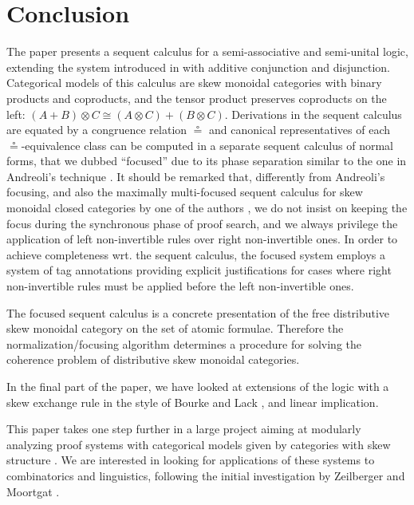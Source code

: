 \documentclass[submission,copyright,creativecommons]{eptcs}
\theoremstyle{definition}
\newcommand{\ot}{\otimes}
\begin{document}
\section{Conclusion}
The paper presents a sequent calculus for a semi-associative and semi-unital logic,  extending the system introduced in \cite{uustalu:sequent:2021} with additive conjunction and disjunction. Categorical models of this calculus are skew monoidal categories with binary products and coproducts, and the tensor product preserves coproducts on the left: $(A + B) \ot C \cong (A \ot C) + (B \ot C)$.
Derivations in the sequent calculus are equated by a congruence relation $\circeq$ and canonical representatives of each $\circeq$-equivalence class can be computed in a separate sequent calculus of normal forms, that we dubbed ``focused'' due to its phase separation similar to the one in Andreoli's technique \cite{andreoli:logic:1992}.  It should be remarked that, differently from Andreoli's focusing, and also the maximally multi-focused sequent calculus for skew monoidal closed categories by one of the authors \cite{veltri:multifocus:23}, we do not insist on keeping the focus during the synchronous phase of proof search, and we always privilege the application of left non-invertible rules over right non-invertible ones. In order to achieve completeness wrt. the sequent calculus, the focused system employs a system of tag annotations providing explicit justifications for cases where right non-invertible rules must be applied before the left non-invertible ones.

The focused sequent calculus is a concrete presentation of the free distributive skew monoidal category on the set of atomic formulae. Therefore the normalization/focusing algorithm determines a procedure for solving the coherence problem of distributive skew monoidal categories.

In the final part of the paper, we have looked at extensions of the logic with a skew exchange rule in the style of Bourke and Lack \cite{bourke:lack:braided:2020}, and linear implication.

This paper takes one step further in a large project aiming at modularly analyzing proof systems with categorical models given by categories with skew structure \cite{zeilberger:semiassociative:19, uustalu:sequent:2021,uustalu:proof:nodate,uustalu:deductive:nodate,veltri:coherence:2021,UVW:protsn,Veltri25}. We are interested in looking for applications of these systems to combinatorics and linguistics, following the initial investigation by Zeilberger \cite{zeilberger:semiassociative:19} and Moortgat \cite{moortgat:tamari:20}.
\end{document}
